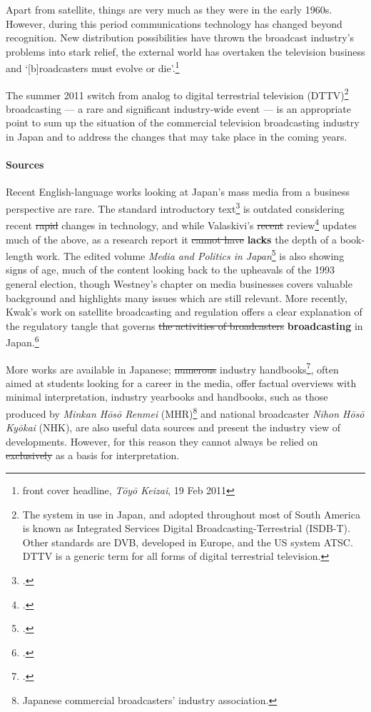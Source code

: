 \documentclass[11pt, oneside, a4paper, headsepline]{scrartcl}
\newcommand{\TYKZ}{\emph{T\={o}y\={o} Keizai}}
\begin{document}
Apart from satellite, things are very much as they were in the early 1960s. However, during this period communications technology has changed beyond recognition. New distribution possibilities have thrown the broadcast industry's problems into stark relief, the external world has overtaken the television business and `[b]roadcasters must evolve or die'.\footnote{front cover headline, \TYKZ, 19 Feb 2011}

The summer 2011 switch from analog to digital terrestrial television (DTTV)\footnote{The system in use in Japan, and adopted throughout most of South America is known as Integrated Services Digital Broadcasting-Terrestrial (ISDB-T). Other standards are DVB, developed in Europe, and the US system ATSC. DTTV is a generic term for all forms of digital terrestrial television.} broadcasting --- a rare and significant industry-wide event --- is an appropriate point to sum up the situation of the commercial television broadcasting industry in Japan and to address the changes that may take place in the coming years.

\paragraph*{Sources}

Recent English-language works looking at Japan's mass media from a business perspective are rare. The standard introductory text\footcite{Cooper-Chen:1997} is outdated considering recent \st{rapid} changes in technology, and while Valaskivi's \st{recent} review\footcite{Valaskivi:2007} updates much of the above, as a research report it \st{cannot have} \textbf{lacks} the depth of a book-length work. The edited volume \emph{Media and Politics in Japan}\footcite{Pharr:1996} is also showing signs of age, much of the content looking back to the upheavals of the 1993 general election, though Westney's chapter on media businesses covers valuable background and highlights many issues which are still relevant. More recently, Kwak's work on satellite broadcasting and regulation offers a clear explanation of the regulatory tangle that governs \st{the activities of broadcasters} \textbf{broadcasting} in Japan.\footcites{Kwak:2008, Kwak:1999}

More works are available in Japanese; \st{numerous} industry handbooks\footcites{Nakano:2008, Nishi:2007,Tanami:2006,Takahashi:2001}, often aimed at students looking for a career in the media, offer factual overviews with minimal interpretation, industry yearbooks and handbooks, such as those produced by \emph{Minkan Hōsō Renmei} (MHR)\footnote{Japanese commercial broadcasters' industry association.} and national broadcaster \emph{Nihon Hōsō Kyōkai} (NHK), are also useful data sources and present the industry view of developments. However, for this reason they cannot always be relied on \st{exclusively} as a basis for interpretation.
\end{document}
